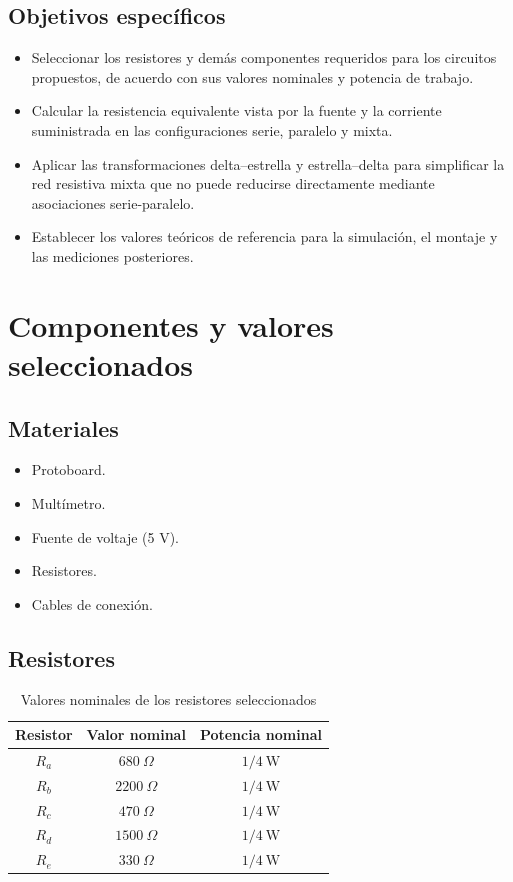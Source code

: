 \documentclass[conference,10pt]{IEEEtran}
\begin{document}
\subsection{Objetivos específicos}
\begin{itemize}
  \item Seleccionar los resistores y demás componentes requeridos para los circuitos propuestos, de acuerdo con sus valores nominales y potencia de trabajo.
  \item Calcular la resistencia equivalente vista por la fuente y la corriente suministrada en las configuraciones serie, paralelo y mixta.
  \item Aplicar las transformaciones delta--estrella y estrella--delta para simplificar la red resistiva mixta que no puede reducirse directamente mediante asociaciones serie-paralelo.
  \item Establecer los valores teóricos de referencia para la simulación, el montaje y las mediciones posteriores.
\end{itemize}

\section{Componentes y valores seleccionados}
\subsection{Materiales}
\begin{itemize}
  \item Protoboard.
  \item Multímetro.
  \item Fuente de voltaje (5 V).
  \item Resistores.
  \item Cables de conexión.
\end{itemize}

\subsection{Resistores}
\begin{table}[H]
  \caption{Valores nominales de los resistores seleccionados}
  \label{tab:resistores}
  \centering
  \begin{tabular}{ccc}
    \toprule
    Resistor & Valor nominal & Potencia nominal \\
    \midrule
    $R_a$ & $680~\Omega$ & $1/4~\mathrm{W}$ \\
    $R_b$ & $2200~\Omega$ & $1/4~\mathrm{W}$ \\
    $R_c$ & $470~\Omega$ & $1/4~\mathrm{W}$ \\
    $R_d$ & $1500~\Omega$ & $1/4~\mathrm{W}$ \\
    $R_e$ & $330~\Omega$ & $1/4~\mathrm{W}$ \\
    \bottomrule
  \end{tabular}
\end{table}
\end{document}
